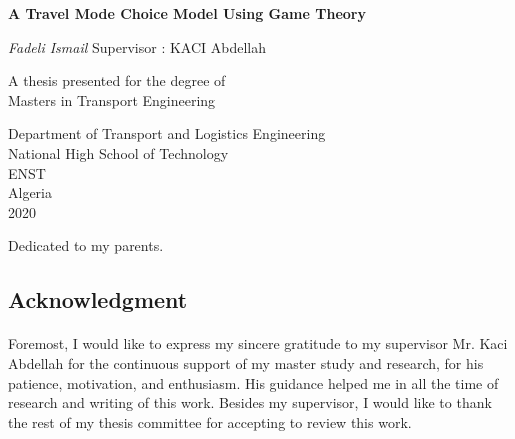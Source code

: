 \documentclass[12pt]{report}
\newenvironment{dedication}
  {\clearpage           %
   \thispagestyle{empty}%
   \vspace*{\stretch{1}}%
   \itshape             %
   \raggedleft          %
  }
  {\par %
   \vspace{\stretch{3}} %
   \clearpage           %
  }
\def\blankpage{%
      \clearpage%
      \thispagestyle{empty}%
      \addtocounter{page}{-1}%
      \null%
      \clearpage}
\begin{document}
\begin{titlepage}

   \begin{center}
   \thisfancypage{%
\setlength{\fboxsep}{10pt}\doublebox}{}
       \vspace*{1cm}
 	   \Huge
       \textbf{A Travel Mode Choice Model Using Game Theory}
		\LARGE
		
       \vspace{0.5cm}
        
            
       \vspace{1.5cm}

       \textit{Fadeli Ismail}
\vfill
\normalsize
Supervisor : KACI Abdellah\\

       \vfill
       
            	\normalsize
       A thesis presented for the degree of\\
       Masters in Transport Engineering
            
       \vspace{0.8cm}
     
       
            \Large
       Department of Transport and Logistics Engineering\\
       National High School of Technology \\
       ENST\\
       Algeria\\
       2020
            
   \end{center}
   

\end{titlepage}
\blankpage
\thispagestyle{empty}
\begin{dedication}
Dedicated to my parents.

\end{dedication}



\clearpage
\begin{center}


\section*{Acknowledgment}
\end{center}
\paragraph{}
Foremost, I would like to express my sincere gratitude to my supervisor Mr. Kaci Abdellah for the continuous support of my master study and research, for his patience, motivation, and enthusiasm. His guidance helped me in all the time of research and writing of this work.
Besides my supervisor, I would like to thank the rest of my thesis committee for accepting to review this work.
\end{document}
